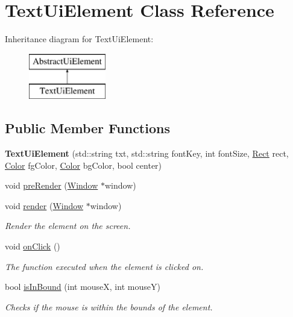 \hypertarget{class_text_ui_element}{}\section{Text\+Ui\+Element Class Reference}
\label{class_text_ui_element}
Inheritance diagram for Text\+Ui\+Element\+:\begin{figure}[H]
\begin{center}
\leavevmode
\includegraphics[height=2.000000cm]{class_text_ui_element}
\end{center}
\end{figure}
\subsection*{Public Member Functions}
\begin{DoxyCompactItemize}
\item 
\mbox{\label{class_text_ui_element_aa973b38864461eec5942975ad901f0d2}} 
{\bfseries Text\+Ui\+Element} (std\+::string txt, std\+::string font\+Key, int font\+Size, \mbox{\hyperlink{struct_rect}{Rect}} rect, \mbox{\hyperlink{struct_color}{Color}} fg\+Color, \mbox{\hyperlink{struct_color}{Color}} bg\+Color, bool center)
\item 
void \mbox{\hyperlink{class_text_ui_element_afe15a4085bc4b7c2cf8668cb6d7fd45d}{pre\+Render}} (\mbox{\hyperlink{class_window}{Window}} $\ast$window)
\item 
void \mbox{\hyperlink{class_text_ui_element_a636883070224511baea505f4ad4655d9}{render}} (\mbox{\hyperlink{class_window}{Window}} $\ast$window)
\begin{DoxyCompactList}\small\item\em Render the element on the screen. \end{DoxyCompactList}\item 
void \mbox{\hyperlink{class_text_ui_element_a984d8bcd627f43c1bd858a707df2c042}{on\+Click}} ()
\begin{DoxyCompactList}\small\item\em The function executed when the element is clicked on. \end{DoxyCompactList}\item 
bool \mbox{\hyperlink{class_text_ui_element_aaf04a9d0a67e77e2ba2a306e1ec7aeed}{is\+In\+Bound}} (int mouseX, int mouseY)
\begin{DoxyCompactList}\small\item\em Checks if the mouse is within the bounds of the element. \end{DoxyCompactList}\end{DoxyCompactItemize}
